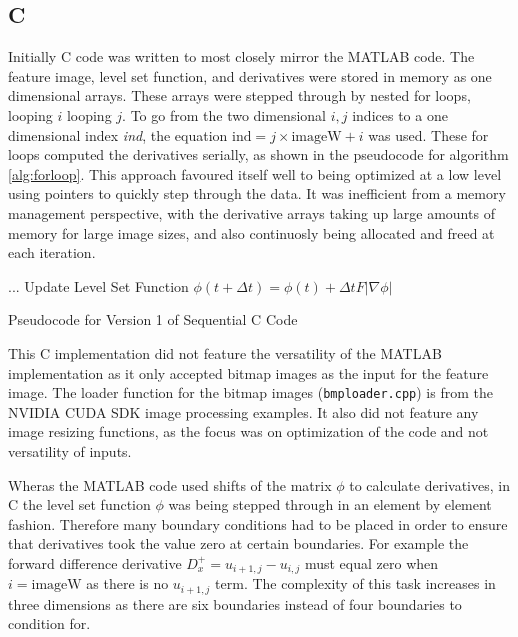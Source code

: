 	\subsection{C}
Initially C code was written to most closely mirror the MATLAB code. The feature image, level set function, and derivatives were stored in memory as one dimensional arrays. These arrays were stepped through by nested for loops, looping $i$ looping $j$. To go from the two dimensional $i,j$ indices to a one dimensional index \textit{ind}, the equation $\textrm{ind} = j \times \textrm{imageW} +i$ was used. These for loops computed the derivatives serially, as shown in the pseudocode for algorithm \ref{alg:forloop}. This approach favoured itself well to being optimized at a low level using pointers to quickly step through the data. It was inefficient from a memory management perspective, with the derivative arrays taking up large amounts of memory for large image sizes, and also continuosly being allocated and freed at each iteration.

\begin{algorithm}[h]
\dontprintsemicolon
{}
\BlankLine
...\;
\BlankLine
Update Level Set Function $\phi(t+\Delta t) =\phi(t) + \Delta t F|\nabla\phi|$\;
\caption{Pseudocode for Version 1 of Sequential C Code}\label{alg:forloop}
\end{algorithm}

This C implementation did not feature the versatility of the MATLAB implementation as it only accepted bitmap images as the input for the feature image. The loader function for the bitmap images (\texttt{bmploader.cpp}) is from the NVIDIA CUDA SDK image processing examples. It also did not feature any image resizing functions, as the focus was on optimization of the code and not versatility of inputs.

Wheras the MATLAB code used shifts of the matrix $\phi$ to calculate derivatives, in C the level set function $\phi$ was being stepped through in an element by element fashion. Therefore many boundary conditions had to be placed in order to ensure that derivatives took the value zero at certain boundaries. For example the forward difference derivative $D_x^+ =u_{i+1,j}-u_{i,j}$ must equal zero when $i=\textrm{imageW}$ as there is no $u_{i+1,j}$ term. The complexity of this task increases in three dimensions as there are six boundaries instead of four boundaries to condition for.


